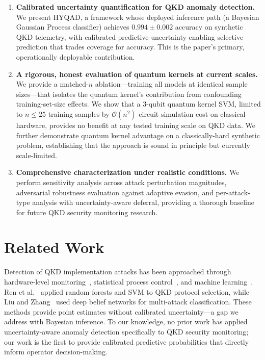 \documentclass[conference,10pt]{IEEEtran}
\begin{document}
\begin{enumerate}
\item \textbf{Calibrated uncertainty quantification for QKD anomaly detection.} We present HYQAD, a framework whose deployed inference path (a Bayesian Gaussian Process classifier) achieves $0.994 \pm 0.002$ accuracy on synthetic QKD telemetry, with calibrated predictive uncertainty enabling selective prediction that trades coverage for accuracy. This is the paper's primary, operationally deployable contribution.

\item \textbf{A rigorous, honest evaluation of quantum kernels at current scales.} We provide a matched-$n$ ablation---training all models at identical sample sizes---that isolates the quantum kernel's contribution from confounding training-set-size effects. We show that a 3-qubit quantum kernel SVM, limited to $n \leq 25$ training samples by $\mathcal{O}(n^2)$ circuit simulation cost on classical hardware, provides no benefit at any tested training scale on QKD data. We further demonstrate quantum kernel advantage on a classically-hard synthetic problem, establishing that the approach is sound in principle but currently scale-limited.

\item \textbf{Comprehensive characterization under realistic conditions.} We perform sensitivity analysis across attack perturbation magnitudes, adversarial robustness evaluation against adaptive evasion, and per-attack-type analysis with uncertainty-aware deferral, providing a thorough baseline for future QKD security monitoring research.
\end{enumerate}

\section{Related Work}
\label{sec:related}

Detection of QKD implementation attacks has been approached through hardware-level monitoring~\cite{honz2019detection,hari2020detection}, statistical process control~\cite{shin2021channe}, and machine learning~\cite{mao2020detecting}. Ren et al.~\cite{ren2021machine} applied random forests and SVM to QKD protocol selection, while Liu and Zhang~\cite{liu2021qkd} used deep belief networks for multi-attack classification. These methods provide point estimates without calibrated uncertainty---a gap we address with Bayesian inference. To our knowledge, no prior work has applied uncertainty-aware anomaly detection specifically to QKD security monitoring; our work is the first to provide calibrated predictive probabilities that directly inform operator decision-making.
\end{document}
